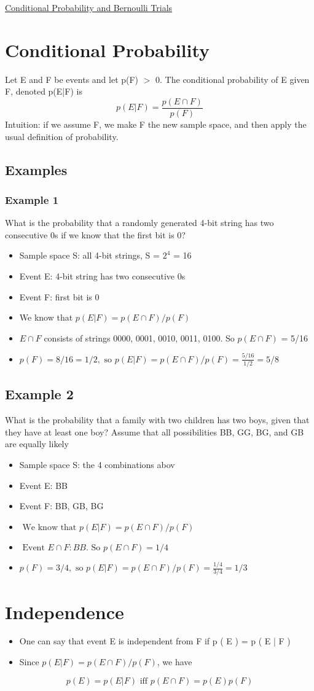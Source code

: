 \documentclass{article}[18pt]
\begin{document}
\begin{center}
\underline{\huge Conditional Probability and Bernoulli Trials}
\end{center}
\section{Conditional Probability}
Let E and F be events and let p(F) $>$ 0. The conditional probability of E given
F, denoted p(E|F) is
$$p ( E | F ) = \frac { p ( E \cap F ) } { p ( F ) }$$
Intuition: if we assume F, we make F the new sample space, and then apply the
usual definition of probability.
\subsection{Examples}
\subsubsection{Example 1}
What is the probability that a randomly generated 4-bit string has two consecutive 0s if we know that the first bit is 0?
\begin{itemize}
	\item Sample space S: all 4-bit strings, S = $2^4$ = 16
	\item Event E: 4-bit string has two consecutive 0s
	\item Event F: first bit is 0
	\item We know that $p ( E | F ) = p ( E \cap F ) / p ( F )$
	\item $E\cap F$ consists of strings 0000, 0001, 0010, 0011, 0100. So $p(E \cap F)$ = 5/16 
	\item $p ( F ) = 8 / 16 = 1 / 2 , \text { so } p ( E | F ) = p ( E \cap F ) / p ( F ) = \frac { 5 / 16 } { 1 / 2 } = 5 / 8$
\end{itemize}
\subsection{Example 2}
What is the probability that a family with two children has two boys, given that they have at least one boy? Assume that all possibilities BB, GG, BG, and GB are equally likely

\begin{itemize}
	\item Sample space S: the 4 combinations abov
	\item Event E: BB
	\item Event F: BB, GB, BG
	\item $\text { We know that } p ( E | F ) = p ( E \cap F ) / p ( F )$
	\item $\text { Event } E \cap F : B B . \text { So } p ( E \cap F ) = 1 / 4$
	\item $p ( F ) = 3 / 4 , \text { so } p ( E | F ) = p ( E \cap F ) / p ( F ) = \frac { 1 / 4 } { 3 / 4 } = 1 / 3$
\end{itemize}
\section{Independence}
\begin{itemize}
	\item One can say that event E is independent from F if p ( E ) = p ( E | F )
	\item Since $p ( E | F ) = p ( E \cap F ) / p ( F )$, we have
\end{itemize}
$$ p ( E ) = p ( E | F ) \text { iff } p ( E \cap F ) = p ( E ) p ( F )$$
\end{document}
